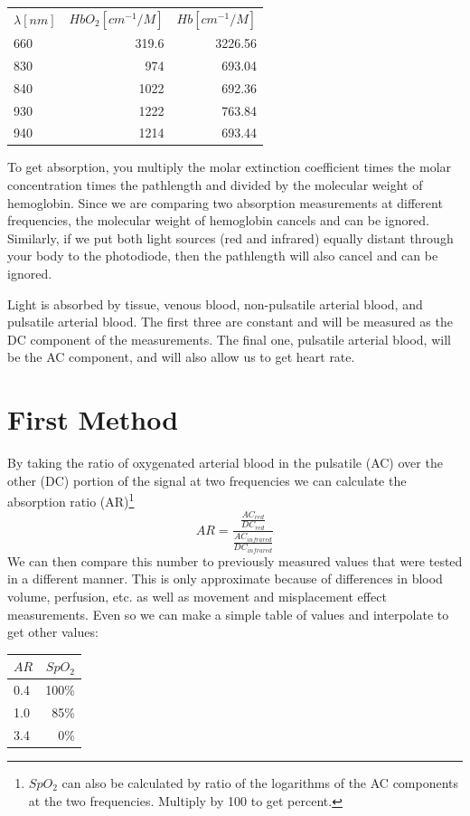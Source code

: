 \begin{tabular}{lrr}
$\lambda[ nm]$  & $HbO_2[ cm^{-1}/M]$ & $Hb[ cm^{-1}/M]$ \\
660              & 319.6                  & 3226.56 \\
830              & 974                    & 693.04 \\
840              & 1022                   & 692.36 \\
930              & 1222                   & 763.84 \\
940              & 1214                   & 693.44 \\
\end{tabular}

To get absorption, you multiply the molar extinction coefficient times the molar concentration times the pathlength and divided by the molecular weight of hemoglobin.  Since we are comparing two absorption measurements at different frequencies, the molecular weight of hemoglobin cancels and can be ignored.  Similarly, if we put both light sources (red and infrared) equally distant through your body to the photodiode, then the pathlength will also cancel and can be ignored.  %

Light is absorbed by tissue, venous blood, non-pulsatile arterial blood, and pulsatile arterial blood.  The first three are constant and will be measured as the DC component of the measurements.  The final one, pulsatile arterial blood, will be the AC component, and will also allow us to get heart rate.

\section{First Method}

By taking the ratio of oxygenated arterial blood in the pulsatile (AC) over the other (DC) portion of the signal at two frequencies we can calculate the absorption ratio (AR)\footnote{$SpO_2$ can also be calculated by ratio of the logarithms of the AC components at the two frequencies.  Multiply by 100 to get percent.}
\begin{equation}
AR = \frac{\frac{AC_{red}}{DC_{red}}}{\frac{AC_{infrared}}{DC_{infrared}}}
\end{equation}
We can then compare this number to previously measured values that were tested in a different manner.  This is only approximate because of differences in blood volume, perfusion, etc. as well as movement and misplacement effect measurements.  Even so we can make a simple table of values and interpolate to get other values:

\begin{tabular}{lr}
$AR$ & $SpO_2$ \\\hline
0.4  & 100\% \\
1.0  & 85\% \\
3.4  & 0\% \\
\end{tabular}

